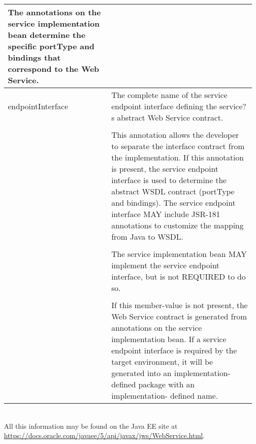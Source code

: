 \begin{tabular}{|p{2cm}|p{11cm}|}
					The annotations on the service implementation bean determine the specific portType and bindings that correspond to the Web Service. \\
	\hline
	endpointInterface 	& The complete name of the service endpoint interface defining the service?s abstract Web Service contract. \\
	\hfill				&  \\ \hfill
	\hfill				& 	This annotation allows the developer to separate the interface contract from the implementation. If this annotation is present,
						the service endpoint interface is used to determine the abstract WSDL contract (portType and bindings). The service endpoint interface
						MAY include JSR-181 annotations to customize the mapping from Java to WSDL. \\
	\hfill				&  \\ \hfill
	\hfill				&	The service implementation bean MAY implement the service endpoint interface, but is not REQUIRED to do so.\\
	\hfill				&  \\ \hfill
	\hfill				&	If this member-value is not present, the Web Service contract is generated from annotations on the service implementation bean. If a service
						endpoint interface is required by the target environment, it will be generated into an implementation-defined package with an implementation-
						defined name. \\
	\hline
	\end {tabular}
	\normalsize
	\\
	All this information may be found on the Java EE site at \url{https://docs.oracle.com/javaee/5/api/javax/jws/WebService.html}.